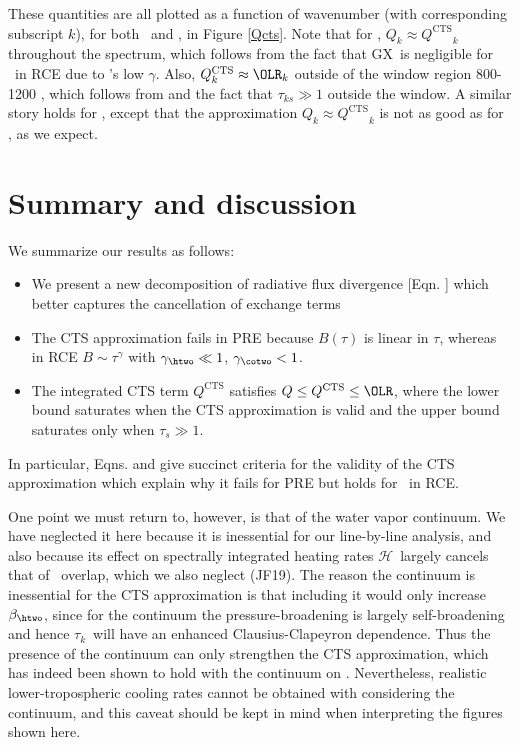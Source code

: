 \documentclass[10pt]{article}
\newcommand{\Qcts}{\ensuremath{Q^\mathrm{CTS}}}
\newcommand{\ch}{\ensuremath{\mathcal{H}}}
\newcommand{\tauk}{\ensuremath{\tau_k}}
\newcommand{\taus}{\ensuremath{\tau_s}}
\newcommand{\GX}{\ensuremath{\mathrm{GX}}}
\begin{document}
These quantities are all plotted as a function of wavenumber (with corresponding subscript $k$),  for both \htwo\ and \cotwo, in Figure \ref{Qcts}. Note that for \htwo, $Q_k\approx \Qcts_k$ throughout the spectrum, which follows from the fact that \GX\ is negligible for \htwo\ in RCE due to \htwo's low $\gamma$. 
Also, $\Qcts_k\approx \OLR_k$ outside of the window region 800-1200 \cminverse, which follows from  and the fact that $\tau_{ks} \gg 1$ outside the window. A similar story holds for \cotwo, except that the approximation $Q_k\approx \Qcts_k$ is not as good as for \htwo, as we expect. 
 

\section{Summary and discussion} \label{sec_summary}
We summarize our results as follows:
\begin{itemize}
	\item We present a new decomposition of radiative flux divergence [Eqn. ] which better captures the cancellation of exchange terms
	\item The CTS approximation  fails in PRE because $B(\tau)$ is linear in $\tau$, whereas in RCE $B\sim \tau^\gamma$ with $\gamma_{\htwo} \ll 1$, $\gamma_{\cotwo} < 1$.
	\item The integrated CTS term $\Qcts$ satisfies $Q\leq\Qcts\leq\OLR$, where the lower bound saturates when the CTS approximation is valid and the upper bound saturates only when $\taus \gg 1$.
\end{itemize}
In particular, Eqns.  and  give succinct criteria for the validity of the CTS approximation which explain why it fails for PRE but holds  for \htwo\ in RCE.

One point we must return to, however, is that of the water vapor continuum. We have neglected it here 
 because it is inessential for our line-by-line analysis, and also because its effect on spectrally integrated heating rates \ch\ largely cancels that of \cotwo\ overlap, which we also neglect (JF19). The reason the continuum is inessential for the CTS approximation is that including it would only increase $\beta_{\htwo}$, since for the continuum the pressure-broadening is largely self-broadening and hence \tauk\ will have an enhanced Clausius-Clapeyron dependence. Thus the presence of the continuum can only strengthen the CTS approximation, which has indeed been shown to hold  with the continuum on \citep{clough1992}.  Nevertheless, realistic lower-tropospheric cooling rates cannot be obtained with considering the continuum, and this caveat should be kept in mind when interpreting the figures shown here.
\end{document}
